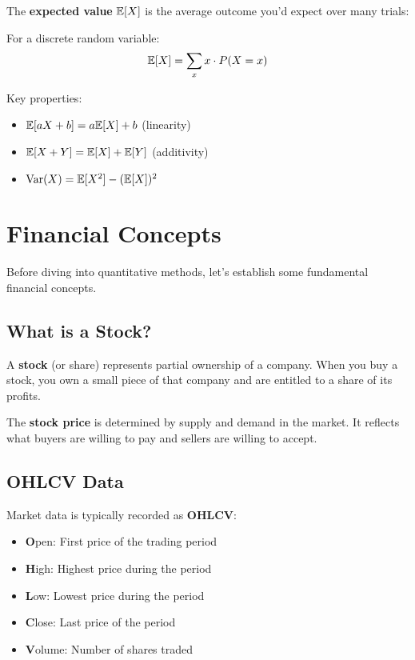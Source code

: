 The \textbf{expected value} $\mathbb{E}[X]$ is the average outcome you'd expect over
many trials:

For a discrete random variable:
\[
\mathbb{E}[X] = \sum_x x \cdot P(X = x)
\]

Key properties:
\begin{itemize}
    \item $\mathbb{E}[aX + b] = a\mathbb{E}[X] + b$ (linearity)
    \item $\mathbb{E}[X + Y] = \mathbb{E}[X] + \mathbb{E}[Y]$ (additivity)
    \item $\text{Var}(X) = \mathbb{E}[X^2] - (\mathbb{E}[X])^2$
\end{itemize}

\section{Financial Concepts}

Before diving into quantitative methods, let's establish some fundamental
financial concepts.

\subsection{What is a Stock?}

A \textbf{stock} (or share) represents partial ownership of a company. When
you buy a stock, you own a small piece of that company and are entitled to
a share of its profits.


The \textbf{stock price} is determined by supply and demand in the market.
It reflects what buyers are willing to pay and sellers are willing to accept.

\subsection{OHLCV Data}

Market data is typically recorded as \textbf{OHLCV}:

\begin{itemize}
    \item \textbf{O}pen: First price of the trading period
    \item \textbf{H}igh: Highest price during the period
    \item \textbf{L}ow: Lowest price during the period
    \item \textbf{C}lose: Last price of the period
    \item \textbf{V}olume: Number of shares traded
\end{itemize}

